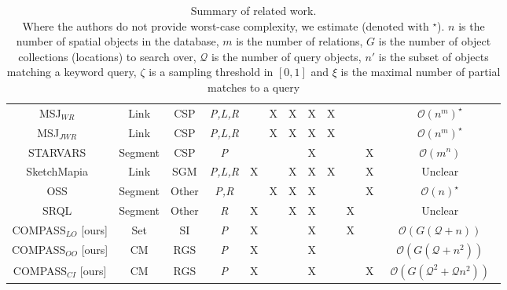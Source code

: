 {{{\begin{table*}[h!]
\begin{center}
\begin{tabular}{|c|ccc|cccc|ccc|c|}
            MSJ$_{WR}$~\cite{Papadias1998}                      & Link & CSP         & \textit{P,L,R} &   & X & X & X & X &   &   & $\mathcal{O}(n^m)^{\star}$ \\ %
            MSJ$_{JWR}$~\cite{Papadias1998}                     & Link & CSP         & \textit{P,L,R} &   & X & X & X & X &   &   & $\mathcal{O}(n^m)^{\star}$ \\ %
            STARVARS~\cite{Lee2013}                             &Segment & CSP         & \textit{P}     &   &   &   & X &   &   & X & $\mathcal{O}(m^n)$ \\
            SketchMapia~\cite{Schwering2014,Jan2015}            & Link   & SGM   & \textit{P,L,R} & X &   & X & X & X &   & X & Unclear \\         %
            OSS~\cite{Liu2003}                                  &Segment & Other & \textit{P,R}   &   & X & X & X &   &   & X & $\mathcal{O}(n)^{\star}$ \\ %
            SRQL~\cite{Dellapenna2012,Dellapenna2017}           &Segment & Other & \textit{R}     & X &   & X & X &   & X &   & Unclear \\
            COMPASS$_{LO}$ [ours]                               & Set    &  SI  & \textit{P}     & X &   &   & X &   & X &   & $\mathcal{O}(G(\mathcal{Q} + n))$ \\    
            COMPASS$_{OO}$ [ours]                               & CM     &  RGS  & \textit{P}     & X &   &   & X &   &   &   & $\mathcal{O}(G(\mathcal{Q} + n^2))$ \\  
            COMPASS$_{CI}$ [ours]                               & CM     &  RGS  & \textit{P}     & X &   &   & X &   &   & X & ~$\mathcal{O}(G(\mathcal{Q}^2 + \mathcal{Q} n^2))$~ \\
            
            
            
            \hline     
        \end{tabular}
        \caption{Summary of related work. \\ \textnormal{Where the authors do not provide worst-case complexity, we estimate (denoted with $^{\star}$). $n$ is the number of spatial objects in the database, $m$ is the number of relations, $G$ is the number of object collections (locations) to search over, $\mathcal{Q}$ is the number of query objects, $n'$ is the subset of objects matching a keyword  query, $\zeta$ is a sampling threshold in $[0,1]$ and $\xi$ is the maximal number of partial matches to a query}} 
        \label{Table:related_work}
    \end{center}
\end{table*}
}
\normalsize


}}

